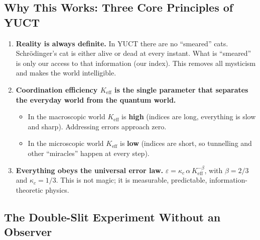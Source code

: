 \documentclass[12pt,a4paper]{article}
\theoremstyle{remark}
\begin{document}
	\subsection{Why This Works: Three Core Principles of YUCT}
	
	\begin{enumerate}[leftmargin=*]
		\item \textbf{Reality is always definite.}
		In YUCT there are no ``smeared'' cats.  Schr\"odinger's cat is
		either alive or dead at every instant.  What is ``smeared'' is
		only our access to that information (our index).  This removes
		all mysticism and makes the world intelligible.
		
		\item \textbf{Coordination efficiency \(K_{\mathrm{eff}}\) is the
			single parameter that separates the everyday world from the
			quantum world.}
		\begin{itemize}
			\item In the macroscopic world \(K_{\mathrm{eff}}\) is
			\textbf{high} (indices are long, everything is slow and
			sharp).  Addressing errors approach zero.
			\item In the microscopic world \(K_{\mathrm{eff}}\) is
			\textbf{low} (indices are short, so tunnelling and other
			``miracles'' happen at every step).
		\end{itemize}
		
		\item \textbf{Everything obeys the universal error law.}
		\( \varepsilon = \kappa_c \, \alpha \, K_{\mathrm{eff}}^{-\beta} \),
		with \( \beta = 2/3 \) and \( \kappa_c = 1/3 \).  This is not
		magic; it is measurable, predictable, information-theoretic
		physics.
	\end{enumerate}
	
	\medskip
	
	\subsection{The Double-Slit Experiment Without an Observer}
	
\end{document}
